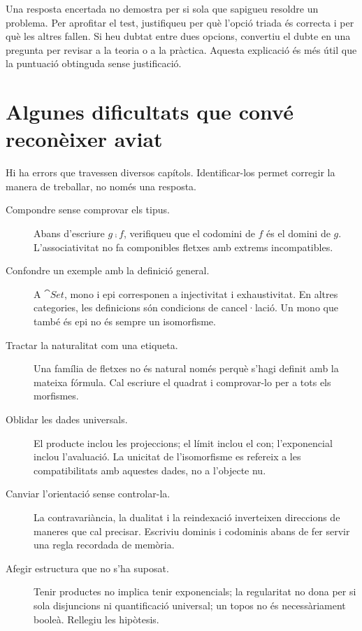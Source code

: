 Una resposta encertada no demostra per si sola que sapigueu
resoldre un problema. Per aprofitar el test, justifiqueu
per què l'opció triada és correcta i per què les altres
fallen. Si heu dubtat entre dues opcions, convertiu el
dubte en una pregunta per revisar a la teoria o a la
pràctica. Aquesta explicació és més útil que la puntuació
obtinguda sense justificació.

\section{Algunes dificultats que convé reconèixer aviat}

Hi ha errors que travessen diversos capítols. Identificar-los
permet corregir la manera de treballar, no només una resposta.

\begin{description}
  \item[Compondre sense comprovar els tipus.]
        Abans d'escriure $g\comp f$, verifiqueu que el
        codomini de $f$ és el domini de $g$. L'associativitat
        no fa componibles fletxes amb extrems incompatibles.
  \item[Confondre un exemple amb la definició general.]
        A $\cat{Set}$, mono i epi corresponen a injectivitat
        i exhaustivitat. En altres categories, les definicions
        són condicions de cancel·lació. Un mono que també
        és epi no és sempre un isomorfisme.
  \item[Tractar la naturalitat com una etiqueta.]
        Una família de fletxes no és natural només perquè
        s'hagi definit amb la mateixa fórmula. Cal escriure
        el quadrat i comprovar-lo per a tots els morfismes.
  \item[Oblidar les dades universals.]
        El producte inclou les projeccions; el límit inclou
        el con; l'exponencial inclou l'avaluació. La unicitat
        de l'isomorfisme es refereix a les compatibilitats
        amb aquestes dades, no a l'objecte nu.
  \item[Canviar l'orientació sense controlar-la.]
        La contravariància, la dualitat i la reindexació
        inverteixen direccions de maneres que cal precisar.
        Escriviu dominis i codominis abans de fer servir
        una regla recordada de memòria.
  \item[Afegir estructura que no s'ha suposat.]
        Tenir productes no implica tenir exponencials;
        la regularitat no dona per si sola disjuncions
        ni quantificació universal; un topos no és
        necessàriament booleà. Rellegiu les hipòtesis.
\end{description}

